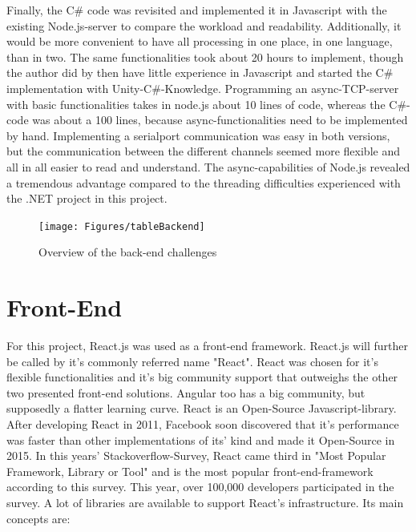 Finally, the  C\# code was revisited and implemented it in Javascript with the existing Node.js-server to compare the workload and readability. 
Additionally, it would be more convenient to have all processing in one place, in one language, than in two.
The same functionalities took about 20 hours to implement, though the author did by then have little experience in Javascript and started the C\# implementation with Unity-C\#-Knowledge.
Programming an async-TCP-server with basic functionalities takes in node.js about 10 lines of code, whereas the C\#-code was about a 100 lines, 
because async-functionalities need to be implemented by hand.
Implementing a serialport communication was easy in both versions, 
but the communication between the different channels seemed more flexible and all in all easier to read and understand.
The async-capabilities of Node.js revealed a tremendous advantage compared to the threading difficulties experienced with the .NET project in this project.
\begin{figure}[th]
	\centering
	\texttt{[image: Figures/tableBackend]}
	\decoRule
	\caption[Back-end Overview]{Overview of the back-end challenges}
	\label{fig:BackEndTable}
\end{figure}

\section{Front-End}
For this project, React.js was used as a front-end framework. 
React.js will further be called by it's commonly referred name "React".
React was chosen for it's flexible functionalities and it's big community support that outweighs the other two presented front-end solutions.
Angular too has a big community, but supposedly a flatter learning curve.
React is an Open-Source Javascript-library. 
After developing React in 2011, Facebook soon discovered that it's performance was faster than other implementations of its' kind \parencite{benchmarkReact}and made it Open-Source in 2015. 
In this years' Stackoverflow-Survey, React came third in "Most Popular Framework, Library or Tool" \parencite{stackOverflowSurvey} and is the most popular front-end-framework according to this survey. 
This year, over 100,000 developers participated in the survey. 
A lot of libraries are available to support React's infrastructure.
Its main concepts are:

